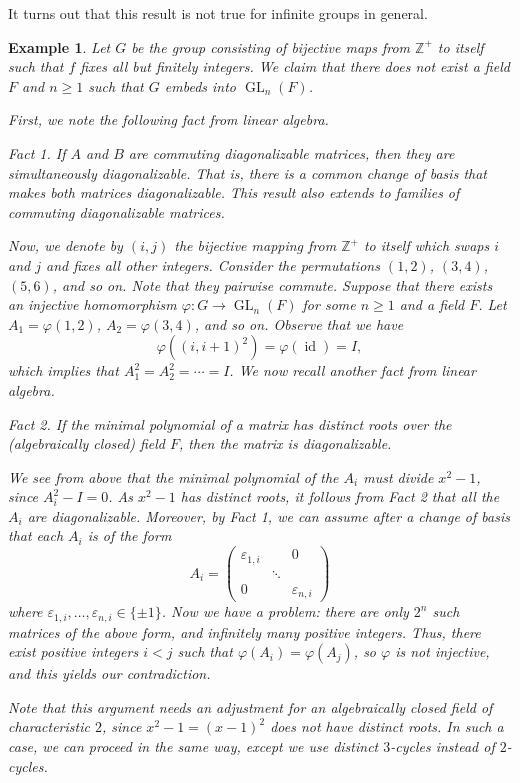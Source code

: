 \documentclass[10pt]{article}
\makeatletter
\numberwithin{equation}{section}
\newcommand{\eps}{\varepsilon}
\newcommand{\Z}{\mathbb{Z}}
\DeclareMathOperator{\GL}{GL}
\DeclareMathOperator{\id}{id}
\theoremstyle{newstyle}
\newtheorem{exmp}[thm]{Example}
\newenvironment{pf}[1][\proofname]{\par
  \pushQED{\qed}%
  \normalfont \topsep0\p@\relax
  \trivlist
  \item[\hskip\labelsep\scshape
  #1\@addpunct{.}]\ignorespaces
}{%
  \popQED\endtrivlist\@endpefalse
}
\makeatother
\begin{document}
It turns out that this result is not true for infinite groups in general. 

\begin{exmp}
Let $G$ be the group consisting of bijective maps from $\Z^+$ to itself such that $f$ fixes all
but finitely integers. We claim that there does not exist a field $F$ and $n \geq 1$ such that 
$G$ embeds into $\GL_n(F)$. 

\begin{pf} 
First, we note the following fact from linear algebra.

{\sc Fact 1.} If $A$ and $B$ are commuting diagonalizable matrices, then they are simultaneously 
diagonalizable. That is, there is a common change of basis that makes both matrices diagonalizable.
This result also extends to families of commuting diagonalizable matrices. 

Now, we denote by $(i, j)$ the bijective mapping from $\Z^+$ to itself which swaps $i$ and $j$ 
and fixes all other integers. Consider the permutations $(1, 2)$, $(3, 4)$, $(5, 6)$, and so on. 
Note that they pairwise commute. Suppose that there exists an injective homomorphism 
$\varphi: G \to \GL_n(F)$ for some $n \geq 1$ and a field $F$. Let $A_1 = \varphi(1, 2)$, 
$A_2 = \varphi(3, 4)$, and so on. Observe that we have 
\[ \varphi((i, i+1)^2) = \varphi(\id) = I, \]
which implies that $A_1^2 = A_2^2 = \cdots = I$. We now recall another fact from linear algebra. 

{\sc Fact 2.} If the minimal polynomial of a matrix has distinct roots over the (algebraically closed) field $F$, then the matrix is diagonalizable. 

We see from above that the minimal polynomial of the $A_i$ must divide $x^2 - 1$, since 
$A_i^2 - I = 0$. As $x^2 - 1$ has distinct roots, it follows from Fact 2 that all the $A_i$ are diagonalizable. Moreover, by Fact 1, we can assume after a change of basis that each $A_i$ is of the form 
\[ A_i = \begin{pmatrix} \eps_{1,i} & & 0 \\ & \ddots & \\ 0 & & \eps_{n,i} \end{pmatrix} \]
where $\eps_{1,i}, \dots, \eps_{n,i} \in \{\pm 1\}$. Now we have a problem: there are only 
$2^n$ such matrices of the above form, and infinitely many positive integers. Thus, there 
exist positive integers $i < j$ such that $\varphi(A_i) = \varphi(A_j)$, so 
$\varphi$ is not injective, and this yields our contradiction.

Note that this argument needs an adjustment for an algebraically closed field of characteristic $2$, 
since $x^2 - 1 = (x - 1)^2$ does not have distinct roots. 
In such a case, we can proceed in the same way, except we use distinct $3$-cycles instead of $2$-cycles.
\end{pf}
\end{exmp}
\end{document}
